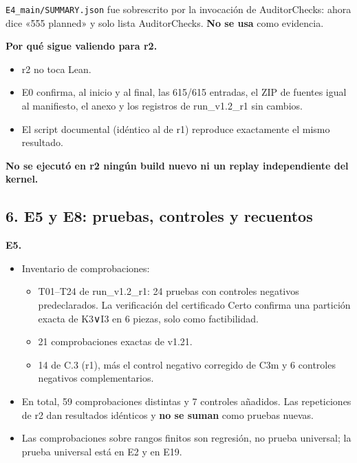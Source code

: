 \documentclass[
]{article}
\providecommand{\tightlist}{%
  \setlength{\itemsep}{0pt}\setlength{\parskip}{0pt}}
\begin{document}
\texttt{E4\_main/SUMMARY.json} fue sobrescrito por la invocación de
AuditorChecks: ahora dice «555 planned» y solo lista AuditorChecks.
\textbf{No se usa} como evidencia.

\textbf{Por qué sigue valiendo para r2.}

\begin{itemize}
\tightlist
\item
  r2 no toca Lean.
\item
  E0 confirma, al inicio y al final, las 615/615 entradas, el ZIP de
  fuentes igual al manifiesto, el anexo y los registros de run\_v1.2\_r1
  sin cambios.
\item
  El script documental (idéntico al de r1) reproduce exactamente el
  mismo resultado.
\end{itemize}

\textbf{No se ejecutó en r2 ningún build nuevo ni un replay
independiente del kernel.}

\subsection{6. E5 y E8: pruebas, controles y
recuentos}\label{6-e5-y-e8-pruebas-controles-y-recuentos}

\textbf{E5.}

\begin{itemize}
\tightlist
\item
  Inventario de comprobaciones:

  \begin{itemize}
  \tightlist
  \item
    T01--T24 de run\_v1.2\_r1: 24 pruebas con controles negativos
    predeclarados. La verificación del certificado Certo confirma una
    partición exacta de K3∨I3 en 6 piezas, solo como factibilidad.
  \item
    21 comprobaciones exactas de v1.21.
  \item
    14 de C.3 (r1), más el control negativo corregido de C3m y 6
    controles negativos complementarios.
  \end{itemize}
\item
  En total, 59 comprobaciones distintas y 7 controles añadidos. Las
  repeticiones de r2 dan resultados idénticos y \textbf{no se suman}
  como pruebas nuevas.
\item
  Las comprobaciones sobre rangos finitos son regresión, no prueba
  universal; la prueba universal está en E2 y en E19.
\end{itemize}
\end{document}
